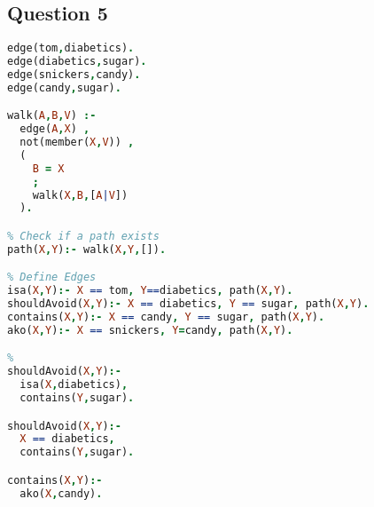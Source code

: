 \documentclass{article}
\begin{document}
\subsection{Question 5}
\begin{minipage}{\linewidth}
\begin{lstlisting}[language=prolog]
edge(tom,diabetics).
edge(diabetics,sugar).
edge(snickers,candy).
edge(candy,sugar).

walk(A,B,V) :-       
  edge(A,X) ,        
  not(member(X,V)) , 
  (                  
    B = X
    ;                 
    walk(X,B,[A|V]) 
  ).                  

% Check if a path exists
path(X,Y):- walk(X,Y,[]). 

% Define Edges
isa(X,Y):- X == tom, Y==diabetics, path(X,Y).
shouldAvoid(X,Y):- X == diabetics, Y == sugar, path(X,Y).
contains(X,Y):- X == candy, Y == sugar, path(X,Y).
ako(X,Y):- X == snickers, Y=candy, path(X,Y).

%
shouldAvoid(X,Y):-
  isa(X,diabetics),
  contains(Y,sugar).

shouldAvoid(X,Y):-
  X == diabetics,
  contains(Y,sugar).

contains(X,Y):-
  ako(X,candy).
\end{lstlisting}
\end{minipage}
\end{document}
